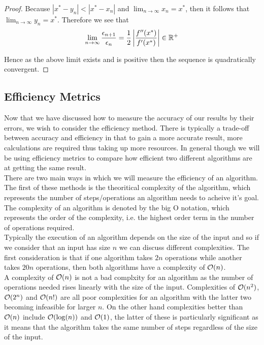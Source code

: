 \begin{Uniform Convergence Thm}
\begin{proof}
Because \(|x^\ast - y_n| < |x^\ast - x_n|\) and \(\lim_{n\to\infty}x_n = x^\ast\), then it follows that \(\lim_{n\to\infty}y_n = x^\ast\). Therefore we see that
\[\lim_{n\to\infty}\frac{\epsilon_{n+1}}{\epsilon_n} = \frac{1}{2}\left|\frac{f''(x^\ast)}{f'(x^\ast)}\right| \in \mathbb{R}^+\]

Hence as the above limit exists and is positive then the sequence is quadratically convergent.
\end{proof}

\subsection{Efficiency Metrics}
\label{SUB_"Efficiency Metrics"}

Now that we have discussed how to measure the accuracy of our results by their errors, we wish to consider the efficiency method. There is typically a trade-off between accuracy and efficiency in that to gain a more accurate result, more calculations are required thus taking up more resources. In general though we will be using efficiency metrics to compare how efficient two different algorithms are at getting the same result.\\

There are two main ways in which we will measure the efficiency of an algorithm. The first of these methods is the theoritical complexity of the algorithm, which represents the number of steps/operations an algorithm needs to acheive it's goal. The complexity of an algorithm is denoted by the big O notation, which represents the order of the complexity, i.e. the highest order term in the number of operations required.\\

Typically the execution of an algorithm depends on the size of the input and so if we consider that an input has size \(n\) we can discuss different complexities. The first consideration is that if one algorithm takes \(2n\) operations while another takes \(20n\) operations, then both algorithms have a complexity of \(\mathcal{O}(n)\). \\

A complexity of \(\mathcal{O}(n)\) is not a bad complxity for an algorithm as the number of operations needed rises linearly with the size of the input. Complexities of \(\mathcal{O}(n^2)\), \(\mathcal{O}(2^n)\) and \(\mathcal{O}(n!)\) are all poor complexities for an algorithm with the latter two becoming infeasible for larger \(n\). On the other hand complexities better than \(\mathcal{O}(n)\) include \(\mathcal{O}(\log(n))\) and \(\mathcal{O}(1)\), the latter of these is particularly significant as it means that the algorithm takes the same number of steps regardless of the size of the input.\\


\end{Uniform Convergence Thm}
